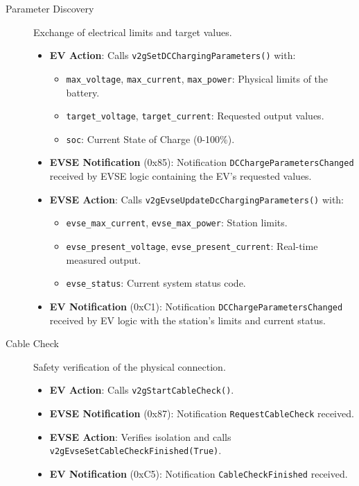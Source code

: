 \documentclass[a4paper,11pt]{report}
\begin{document}
\begin{description}
    \item[Parameter Discovery] Exchange of electrical limits and target values.
    \begin{itemize}
        \item \textbf{EV Action}: Calls \texttt{v2gSetDCChargingParameters()} with:
        \begin{itemize}
            \item \texttt{max\_voltage}, \texttt{max\_current}, \texttt{max\_power}: Physical limits of the battery.
            \item \texttt{target\_voltage}, \texttt{target\_current}: Requested output values.
            \item \texttt{soc}: Current State of Charge (0-100\%).
        \end{itemize}
        \item \textbf{EVSE Notification} (0x85): Notification \texttt{DCChargeParametersChanged} received by EVSE logic containing the EV's requested values.
        \item \textbf{EVSE Action}: Calls \texttt{v2gEvseUpdateDcChargingParameters()} with:
        \begin{itemize}
            \item \texttt{evse\_max\_current}, \texttt{evse\_max\_power}: Station limits.
            \item \texttt{evse\_present\_voltage}, \texttt{evse\_present\_current}: Real-time measured output.
            \item \texttt{evse\_status}: Current system status code.
        \end{itemize}
        \item \textbf{EV Notification} (0xC1): Notification \texttt{DCChargeParametersChanged} received by EV logic with the station's limits and current status.
    \end{itemize}

    \item[Cable Check] Safety verification of the physical connection.
    \begin{itemize}
        \item \textbf{EV Action}: Calls \texttt{v2gStartCableCheck()}.
        \item \textbf{EVSE Notification} (0x87): Notification \texttt{RequestCableCheck} received.
        \item \textbf{EVSE Action}: Verifies isolation and calls \texttt{v2gEvseSetCableCheckFinished(True)}.
        \item \textbf{EV Notification} (0xC5): Notification \texttt{CableCheckFinished} received.
    \end{itemize}


\end{description}
\end{document}
